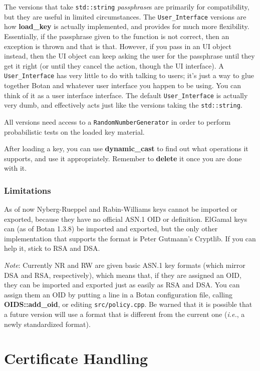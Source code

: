 \documentclass{article}
\newcommand{\filename}[1]{\texttt{#1}}
\newcommand{\function}[1]{\textbf{#1}}
\newcommand{\type}[1]{\texttt{#1}}
\renewcommand{\arg}[1]{\textsl{#1}}
\newcommand{\ie}[0]{\emph{i.e.}}
\begin{document}
The versions that take \type{std::string} \arg{passphrase}s are primarily for
compatibility, but they are useful in limited circumstances. The
\type{User\_Interface} versions are how \function{load\_key} is actually
implemented, and provides for much more flexibility. Essentially, if the
passphrase given to the function is not correct, then an exception is thrown
and that is that. However, if you pass in an UI object instead, then the UI
object can keep asking the user for the passphrase until they get it right (or
until they cancel the action, though the UI interface). A
\type{User\_Interface} has very little to do with talking to users; it's just a
way to glue together Botan and whatever user interface you happen to be
using. You can think of it as a user interface interface. The default
\type{User\_Interface} is actually very dumb, and effectively acts just like
the versions taking the \type{std::string}.

All versions need access to a \type{RandomNumberGenerator} in order to
perform probabilistic tests on the loaded key material.

After loading a key, you can use \function{dynamic\_cast} to find out what
operations it supports, and use it appropriately. Remember to \function{delete}
it once you are done with it.

\subsubsection{Limitations}

As of now Nyberg-Rueppel and Rabin-Williams keys cannot be imported or
exported, because they have no official ASN.1 OID or definition. ElGamal keys
can (as of Botan 1.3.8) be imported and exported, but the only other
implementation that supports the format is Peter Gutmann's Cryptlib. If you
can help it, stick to RSA and DSA.

\emph{Note}: Currently NR and RW are given basic ASN.1 key formats (which
mirror DSA and RSA, respectively), which means that, if they are assigned an
OID, they can be imported and exported just as easily as RSA and DSA. You can
assign them an OID by putting a line in a Botan configuration file, calling
\function{OIDS::add\_oid}, or editing \filename{src/policy.cpp}. Be warned that
it is possible that a future version will use a format that is different from
the current one (\ie, a newly standardized format).

\pagebreak
\section{Certificate Handling}
\end{document}
